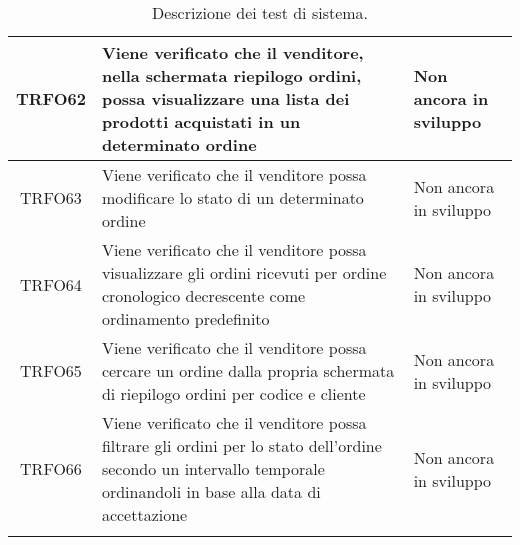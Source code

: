 \begin{longtable}{|c| C{10cm} |C{3cm}|}
    	TRFO62 & Viene verificato che il venditore, nella schermata riepilogo ordini,  possa visualizzare una lista dei prodotti acquistati in un determinato ordine & Non ancora in sviluppo\\ \hline
    	TRFO63 & Viene verificato che il venditore possa modificare lo stato di un determinato ordine & Non ancora in sviluppo\\ \hline
	TRFO64 & Viene verificato che il venditore possa visualizzare gli ordini ricevuti per ordine cronologico decrescente come ordinamento predefinito & Non ancora in sviluppo\\ \hline
	TRFO65 & Viene verificato che il venditore possa cercare un ordine dalla propria schermata di riepilogo ordini per codice e cliente & Non ancora in sviluppo\\ \hline
    	TRFO66 & Viene verificato che il venditore possa filtrare gli ordini per lo stato dell'ordine secondo un intervallo temporale ordinandoli in base alla data di accettazione & Non ancora in sviluppo\\ 
    	\caption{Descrizione dei test di sistema.}
\end{longtable}
